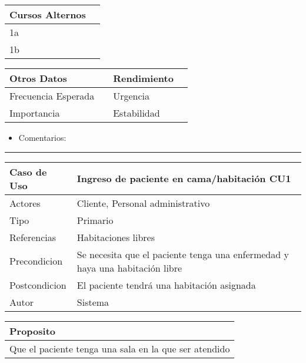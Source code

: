 \documentclass[11pt]{article}
\begin{document}
\begin{center}
\begin{tabular}{ll}
\hline
Cursos Alternos & \\
\hline
1a & \\
\hline
1b & \\
\hline
\end{tabular}
\end{center}


\begin{center}
\begin{tabular}{llll}
\hline
Otros Datos &  & Rendimiento & \\
\hline
Frecuencia Esperada &  & Urgencia & \\
\hline
Importancia &  & Estabilidad & \\
\hline
\end{tabular}
\end{center}


\begin{itemize}
\item Comentarios:
\end{itemize}

\noindent\rule{\textwidth}{0.5pt}








\begin{center}
\begin{tabular}{ll}
\hline
Caso de Uso & Ingreso de paciente en cama/habitación      \vline CU1\\
\hline
Actores & Cliente, Personal administrativo\\
\hline
Tipo & Primario\\
\hline
Referencias & Habitaciones libres\\
\hline
Precondicion & Se necesita que el paciente tenga una enfermedad y haya una habitación libre\\
\hline
Postcondicion & El paciente tendrá una habitación asignada\\
\hline
Autor & Sistema\\
\hline
\end{tabular}
\end{center}


\begin{center}
\begin{tabular}{l}
\hline
Proposito\\
\hline
Que el paciente tenga una sala en la que ser atendido\\
\hline
\end{tabular}
\end{center}
\end{document}
